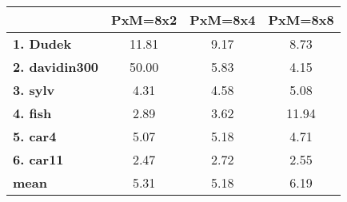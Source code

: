 \begin{tabular}{|l|c|c|c|}
\hline
&\textbf{PxM=8x2}&\textbf{PxM=8x4}&\textbf{PxM=8x8}\\\hline
\textbf{1. Dudek}&11.81&9.17&8.73\\\hline
\textbf{2. davidin300}&50.00&5.83&4.15\\\hline
\textbf{3. sylv}&4.31&4.58&5.08\\\hline
\textbf{4. fish}&2.89&3.62&11.94\\\hline
\textbf{5. car4}&5.07&5.18&4.71\\\hline
\textbf{6. car11}&2.47&2.72&2.55\\\hline
\textbf{mean}&5.31&5.18&6.19\\\hline
\end{tabular}
